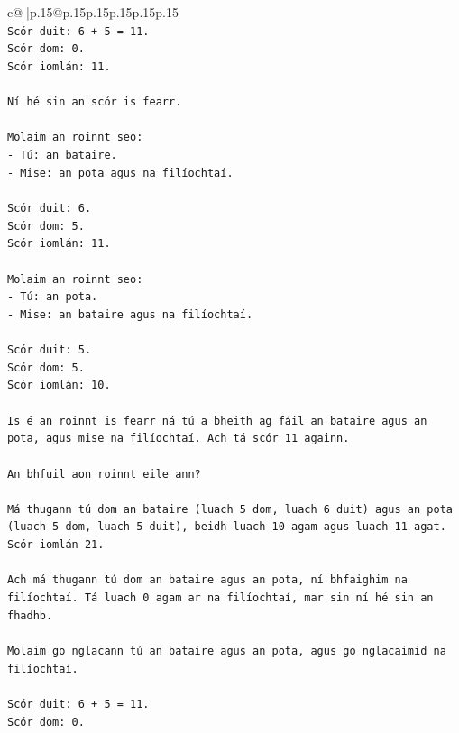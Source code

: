\documentclass{article}
\begin{document}
{\begin{supertabular}{c@{$\;$}|p{.15\linewidth}@{}p{.15\linewidth}p{.15\linewidth}p{.15\linewidth}p{.15\linewidth}p{.15\linewidth}}
{{{\\ 
\texttt{Scór duit: 6 + 5 = 11.} \\
\texttt{Scór dom: 0.} \\
\texttt{Scór iomlán: 11.} \\
\\ 
\texttt{Ní hé sin an scór is fearr.} \\
\\ 
\texttt{Molaim an roinnt seo:} \\
\texttt{{-} Tú: an bataire.} \\
\texttt{{-} Mise: an pota agus na filíochtaí.} \\
\\ 
\texttt{Scór duit: 6.} \\
\texttt{Scór dom: 5.} \\
\texttt{Scór iomlán: 11.} \\
\\ 
\texttt{Molaim an roinnt seo:} \\
\texttt{{-} Tú: an pota.} \\
\texttt{{-} Mise: an bataire agus na filíochtaí.} \\
\\ 
\texttt{Scór duit: 5.} \\
\texttt{Scór dom: 5.} \\
\texttt{Scór iomlán: 10.} \\
\\ 
\texttt{Is é an roinnt is fearr ná tú a bheith ag fáil an bataire agus an pota, agus mise na filíochtaí. Ach tá scór 11 againn.} \\
\\ 
\texttt{An bhfuil aon roinnt eile ann?} \\
\\ 
\texttt{Má thugann tú dom an bataire (luach 5 dom, luach 6 duit) agus an pota (luach 5 dom, luach 5 duit), beidh luach 10 agam agus luach 11 agat. Scór iomlán 21.} \\
\\ 
\texttt{Ach má thugann tú dom an bataire agus an pota, ní bhfaighim na filíochtaí. Tá luach 0 agam ar na filíochtaí, mar sin ní hé sin an fhadhb.} \\
\\ 
\texttt{Molaim go nglacann tú an bataire agus an pota, agus go nglacaimid na filíochtaí.} \\
\\ 
\texttt{Scór duit: 6 + 5 = 11.} \\
\texttt{Scór dom: 0.} \\
}}}
\end{supertabular}}
\end{document}
